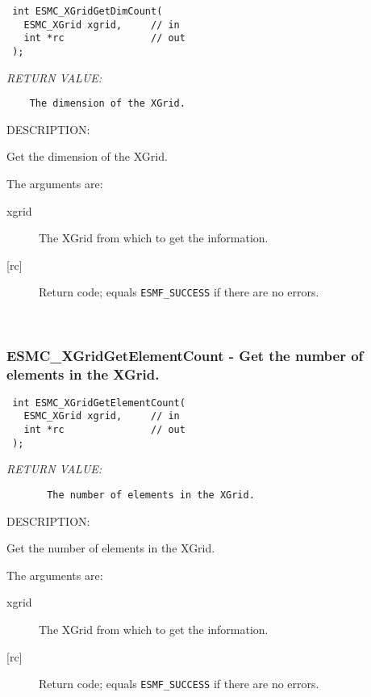   
\begin{verbatim} int ESMC_XGridGetDimCount(
   ESMC_XGrid xgrid,     // in
   int *rc               // out
 );
 \end{verbatim}{\em RETURN VALUE:}
\begin{verbatim}    The dimension of the XGrid.\end{verbatim}
{\sf DESCRIPTION:\\ }


  
     Get the dimension of the XGrid.
  
    The arguments are:
    \begin{description}
    \item[xgrid]
      The XGrid from which to get the information.
    \item[{[rc]}]
      Return code; equals {\tt ESMF\_SUCCESS} if there are no errors.
    \end{description}
   
 
\mbox{}\hrulefill\ 
 
\subsubsection [ESMC\_XGridGetElementCount] {ESMC\_XGridGetElementCount - Get the number of elements in the XGrid.}


  
\begin{verbatim} int ESMC_XGridGetElementCount(
   ESMC_XGrid xgrid,     // in
   int *rc               // out
 );
 \end{verbatim}{\em RETURN VALUE:}
\begin{verbatim}       The number of elements in the XGrid.\end{verbatim}
{\sf DESCRIPTION:\\ }


  
      Get the number of elements in the XGrid.
  
    The arguments are:
    \begin{description}
    \item[xgrid]
      The XGrid from which to get the information.
    \item[{[rc]}]
      Return code; equals {\tt ESMF\_SUCCESS} if there are no errors.
    \end{description}
   

